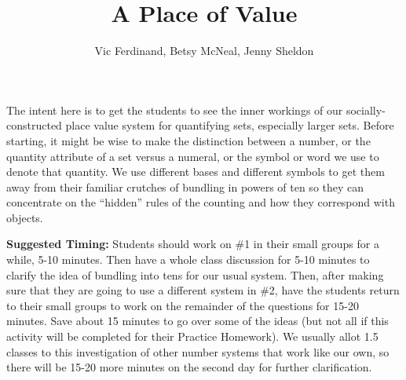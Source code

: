 \documentclass{ximera}
\title{A Place of Value}
\author{Vic Ferdinand, Betsy McNeal, Jenny Sheldon}
\begin{document}
\begin{abstract}\end{abstract}
\maketitle

\begin{instructorIntro}
The intent here is to get the students to see the inner workings of our socially-constructed place value system for quantifying sets, especially larger sets.  Before starting, it might be wise to make the distinction between a number, or the quantity attribute of a set versus a numeral, or the symbol or word we use to denote that quantity. We use different bases and different symbols to get them away from their familiar crutches of bundling in powers of ten so they can concentrate on the ``hidden'' rules of the counting and how they correspond with objects.

{\bf Suggested Timing:} Students should work on \#1 in their small groups for a while, 5-10 minutes.  Then have a whole class discussion for 5-10 minutes to clarify the idea of bundling into tens for our usual system.  Then, after making sure that they are going to use a different system in \#2, have the students return to their small groups to work on the remainder of the questions for 15-20 minutes.  Save about 15 minutes to go over some of the ideas (but not all if this activity will be completed for their Practice Homework).  We usually allot 1.5 classes to this investigation of other number systems that work like our own, so there will be 15-20 more minutes on the second day for further clarification.

\end{instructorIntro}
\end{document}
